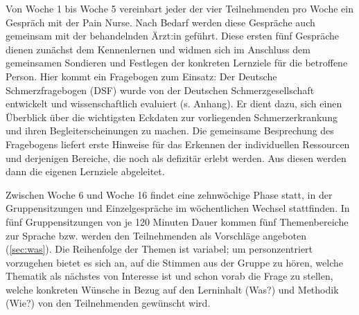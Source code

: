\documentclass[
  twoside,
  parskip=half-,
  paper=176mm:246mm,
  BCOR=14mm,
  DIV=14,
]{scrreprt}
\begin{document}
Von Woche 1 bis Woche 5 vereinbart jeder der vier Teilnehmenden pro Woche ein Gespräch mit der Pain Nurse. Nach Bedarf werden diese Gespräche auch gemeinsam mit der behandelnden Ärzt:in geführt. Diese ersten fünf Gespräche dienen zunächst dem Kennenlernen und widmen sich im Anschluss dem gemeinsamen Sondieren und Festlegen der konkreten Lernziele für die betroffene Person. Hier kommt ein Fragebogen zum Einsatz: Der Deutsche Schmerzfragebogen (DSF) wurde von der Deutschen Schmerzgesellschaft entwickelt und wissenschaftlich evaluiert (s. Anhang). Er dient dazu, sich einen Überblick über die wichtigsten Eckdaten zur vorliegenden Schmerzerkrankung und ihren Begleiterscheinungen zu machen. Die gemeinsame Besprechung des Fragebogens liefert erste Hinweise für das Erkennen  der individuellen Ressourcen und derjenigen Bereiche, die noch als defizitär erlebt werden. Aus diesen werden dann die eigenen Lernziele abgeleitet. 

Zwischen Woche 6 und Woche 16 findet eine zehnwöchige Phase statt, in der Gruppensitzungen und Einzelgespräche im wöchentlichen Wechsel stattfinden. In fünf Gruppensitzungen von je 120 Minuten Dauer kommen fünf Themenbereiche zur Sprache bzw. werden den Teilnehmenden als Vorschläge angeboten (\autoref{sec:was}). Die Reihenfolge der Themen ist variabel; um personzentriert vorzugehen bietet es sich an, auf die Stimmen aus der Gruppe zu hören, welche Thematik als nächstes von Interesse ist und schon vorab die Frage zu stellen, welche konkreten Wünsche in Bezug auf den Lerninhalt (Was?) und Methodik (Wie?) von den Teilnehmenden gewünscht wird.
\end{document}
